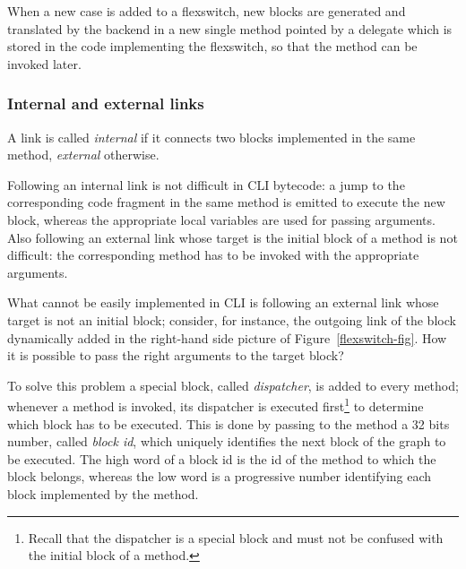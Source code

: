 When  a new case is added to a flexswitch, new blocks are generated
and translated by the backend in a new single method pointed
by a delegate which is stored in the code implementing the flexswitch,
so that the method can be invoked later.

\subsubsection{Internal and external links}

A link is called \emph{internal} if it connects two blocks implemented in the same method,
 \emph{external} otherwise.

Following an internal link is not difficult in CLI bytecode: a jump to
the corresponding code fragment in the same method is emitted 
to execute the new block, whereas the appropriate local variables are
used for passing arguments.
Also following an external link whose target is the initial block of a
method is not difficult: the corresponding method has to be invoked
with the appropriate arguments.

What cannot be easily implemented in CLI is following an external link
whose target is not an initial block; consider, for instance, the
outgoing link of the block dynamically added in the right-hand side
picture of Figure~\ref{flexswitch-fig}. How it is possible to pass the
right arguments to the target block?

To solve this problem a special block, called \emph{dispatcher}, is
added to every method; whenever a method is invoked, its dispatcher is
executed first\footnote{Recall that the dispatcher is a special block
and must not be confused with the initial block of a method.} to
determine which block has to be executed.
This is done by passing to the method a 32 bits number, called 
\emph{block id}, which uniquely identifies the next block of the graph to be executed.
The high word of a block id is the id of the method to which the block
belongs, whereas the low word is a progressive number identifying
each block implemented by the method.

